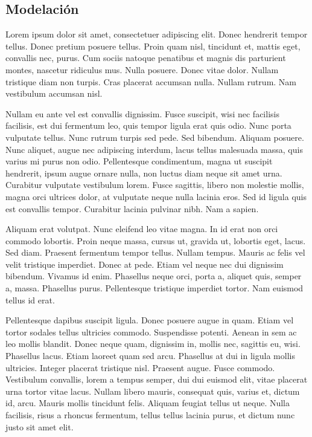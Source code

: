 \subsection{Modelación}

Lorem ipsum dolor sit amet, consectetuer adipiscing elit.  Donec
hendrerit tempor tellus.  Donec pretium posuere tellus.  Proin quam
nisl, tincidunt et, mattis eget, convallis nec, purus.  Cum sociis
natoque penatibus et magnis dis parturient montes, nascetur ridiculus
mus.  Nulla posuere.  Donec vitae dolor.  Nullam tristique diam non
turpis.  Cras placerat accumsan nulla.  Nullam rutrum.  Nam vestibulum
accumsan nisl.

Nullam eu ante vel est convallis dignissim.  Fusce suscipit, wisi nec
facilisis facilisis, est dui fermentum leo, quis tempor ligula erat
quis odio.  Nunc porta vulputate tellus.  Nunc rutrum turpis sed pede.
Sed bibendum.  Aliquam posuere.  Nunc aliquet, augue nec adipiscing
interdum, lacus tellus malesuada massa, quis varius mi purus non odio.
Pellentesque condimentum, magna ut suscipit hendrerit, ipsum augue
ornare nulla, non luctus diam neque sit amet urna.  Curabitur
vulputate vestibulum lorem.  Fusce sagittis, libero non molestie
mollis, magna orci ultrices dolor, at vulputate neque nulla lacinia
eros.  Sed id ligula quis est convallis tempor.  Curabitur lacinia
pulvinar nibh.  Nam a sapien.


Aliquam erat volutpat.  Nunc eleifend leo vitae magna.  In id erat non
orci commodo lobortis.  Proin neque massa, cursus ut, gravida ut,
lobortis eget, lacus.  Sed diam.  Praesent fermentum tempor tellus.
Nullam tempus.  Mauris ac felis vel velit tristique imperdiet.  Donec
at pede.  Etiam vel neque nec dui dignissim bibendum.  Vivamus id
enim.  Phasellus neque orci, porta a, aliquet quis, semper a, massa.
Phasellus purus.  Pellentesque tristique imperdiet tortor.  Nam
euismod tellus id erat.

Pellentesque dapibus suscipit ligula.  Donec posuere augue in quam.
Etiam vel tortor sodales tellus ultricies commodo.  Suspendisse
potenti.  Aenean in sem ac leo mollis blandit.  Donec neque quam,
dignissim in, mollis nec, sagittis eu, wisi.  Phasellus lacus.  Etiam
laoreet quam sed arcu.  Phasellus at dui in ligula mollis ultricies.
Integer placerat tristique nisl.  Praesent augue.  Fusce commodo.
Vestibulum convallis, lorem a tempus semper, dui dui euismod elit,
vitae placerat urna tortor vitae lacus.  Nullam libero mauris,
consequat quis, varius et, dictum id, arcu.  Mauris mollis tincidunt
felis.  Aliquam feugiat tellus ut neque.  Nulla facilisis, risus a
rhoncus fermentum, tellus tellus lacinia purus, et dictum nunc justo
sit amet elit.


